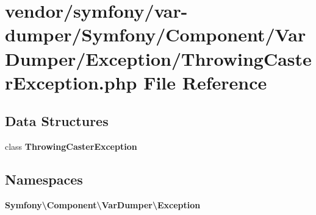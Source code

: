 \section{vendor/symfony/var-\/dumper/\+Symfony/\+Component/\+Var\+Dumper/\+Exception/\+Throwing\+Caster\+Exception.php File Reference}
\label{_throwing_caster_exception_8php}
\subsection*{Data Structures}
\begin{DoxyCompactItemize}
\item 
class {\bf Throwing\+Caster\+Exception}
\end{DoxyCompactItemize}
\subsection*{Namespaces}
\begin{DoxyCompactItemize}
\item 
 {\bf Symfony\textbackslash{}\+Component\textbackslash{}\+Var\+Dumper\textbackslash{}\+Exception}
\end{DoxyCompactItemize}
